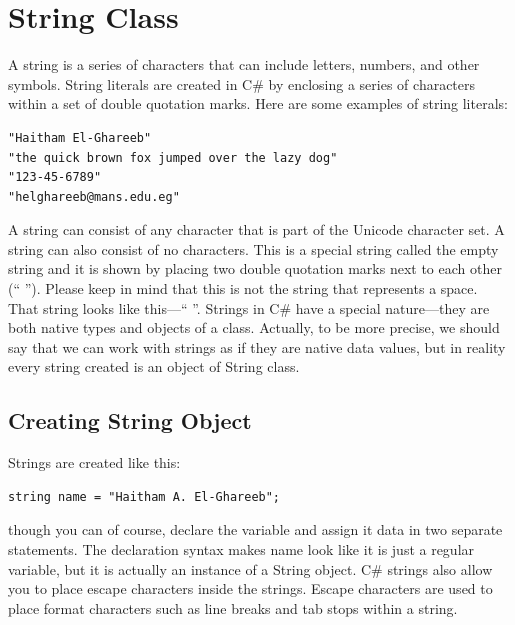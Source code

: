 \documentclass[12pt,a4paper,final,twoside,titlepage]{book}
\begin{document}
\section{String Class}
A string is a series of characters that can include letters, numbers, and other symbols. String literals are created in C\# by enclosing a series of characters within a set of double quotation marks. Here are some examples of string literals:
\begin{lstlisting}
"Haitham El-Ghareeb"
"the quick brown fox jumped over the lazy dog"
"123-45-6789"
"helghareeb@mans.edu.eg"
\end{lstlisting}
A string can consist of any character that is part of the Unicode character set. A string can also consist of no characters. This is a special string called the empty string and it is shown by placing two double quotation marks next to each other (“ ”). Please keep in mind that this is not the string that represents a space. That string looks like this—“ ”.
Strings in C\# have a special nature—they are both native types and objects of a class. Actually, to be more precise, we should say that we can work with strings as if they are native data values, but in reality every string created is an object of String class.
\subsection{Creating String Object}
Strings are created like this:
\begin{lstlisting}
string name = "Haitham A. El-Ghareeb";
\end{lstlisting}
though you can of course, declare the variable and assign it data in two separate statements. The declaration syntax makes name look like it is just a regular variable, but it is actually an instance of a String object.
C\# strings also allow you to place escape characters inside the strings. Escape characters are used to place format characters such as line breaks and tab stops within a string.
\end{document}
